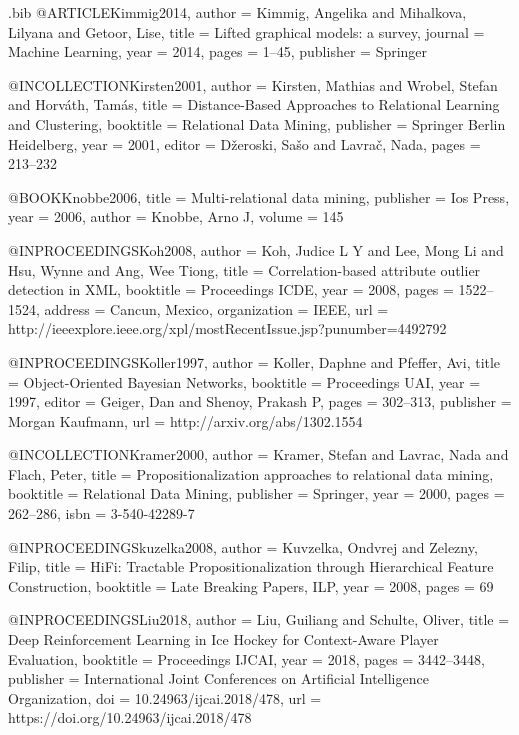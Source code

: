 {\begin{filecontents}{\jobname.bib}
@ARTICLE{Kimmig2014,
  author = {Kimmig, Angelika and Mihalkova, Lilyana and Getoor, Lise},
  title = {{Lifted graphical models: a survey}},
  journal = {Machine Learning},
  year = {2014},
  pages = {1--45},
  publisher = {Springer}
}

@INCOLLECTION{Kirsten2001,
  author = {Kirsten, Mathias and Wrobel, Stefan and Horv{\'{a}}th, Tam{\'{a}}s},
  title = {Distance-Based Approaches to Relational Learning and Clustering},
  booktitle = {Relational Data Mining},
  publisher = {Springer Berlin Heidelberg},
  year = {2001},
  editor = {D{\v{z}}eroski, Sa{\v{s}}o and Lavra{\v{c}}, Nada},
  pages = {213--232}
}

@BOOK{Knobbe2006,
  title = {{Multi-relational data mining}},
  publisher = {Ios Press},
  year = {2006},
  author = {Knobbe, Arno J},
  volume = {145}
}

@INPROCEEDINGS{Koh2008,
  author = {Koh, Judice L Y and Lee, Mong Li and Hsu, Wynne and Ang, Wee Tiong},
  title = {{Correlation-based attribute outlier detection in XML}},
  booktitle = {Proceedings ICDE},
  year = {2008},
  pages = {1522--1524},
  address = {Cancun, Mexico},
  organization = {IEEE},
  url = {http://ieeexplore.ieee.org/xpl/mostRecentIssue.jsp?punumber=4492792}
}

@INPROCEEDINGS{Koller1997,
  author = {Koller, Daphne and Pfeffer, Avi},
  title = {Object-Oriented {Bayesian} Networks},
  booktitle = {Proceedings UAI},
  year = {1997},
  editor = {Geiger, Dan and Shenoy, Prakash P},
  pages = {302--313},
  publisher = {Morgan Kaufmann},
  url = {http://arxiv.org/abs/1302.1554}
}

@INCOLLECTION{Kramer2000,
  author = {Kramer, Stefan and Lavrac, Nada and Flach, Peter},
  title = {Propositionalization approaches to relational data mining},
  booktitle = {Relational Data Mining},
  publisher = {Springer},
  year = {2000},
  pages = {262--286},
  isbn = {3-540-42289-7}
}

@INPROCEEDINGS{kuzelka2008,
  author = {Kuvzelka, Ondvrej and Zelezny, Filip},
  title = {HiFi: Tractable Propositionalization through Hierarchical Feature
	Construction},
  booktitle = {Late Breaking Papers, ILP},
  year = {2008},
  pages = {69}
}

@INPROCEEDINGS{Liu2018,
  author = {Liu, Guiliang and Schulte, Oliver},
  title = {{Deep Reinforcement Learning in Ice Hockey for Context-Aware Player
	Evaluation}},
  booktitle = {Proceedings IJCAI},
  year = {2018},
  pages = {3442--3448},
  publisher = {International Joint Conferences on Artificial Intelligence Organization},
  doi = {10.24963/ijcai.2018/478},
  url = {https://doi.org/10.24963/ijcai.2018/478}
}


\end{filecontents}}
